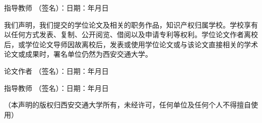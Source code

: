 \vspace{1em}
指导教师 （签名）：\hfill 日期：\hspace{4em}年\hspace{3em}月\hspace{3em}日\hspace{4em}


\vspace{1em}
\begin{center}\end{center}

我们声明，我们提交的学位论文及相关的职务作品，知识产权归属学校。学校享有以任何方式发表、复制、公开阅览、借阅以及申请专利等权利。学位论文作者离校后，或学位论文导师因故离校后，发表或使用学位论文或与该论文直接相关的学术论文或成果时，署名单位仍然为西安交通大学。

\vspace{1em}
论文作者 （签名）：\hfill 日期：\hspace{4em}年\hspace{3em}月\hspace{3em}日\hspace{4em}

指导教师 （签名）：\hfill 日期：\hspace{4em}年\hspace{3em}月\hspace{3em}日\hspace{4em}


\vspace{2em}
\noindent （本声明的版权归西安交通大学所有，未经许可，任何单位及任何个人不得擅自使用）
